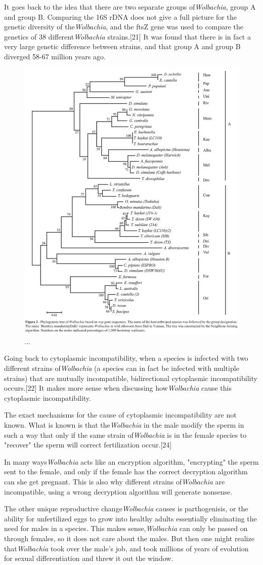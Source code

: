 \documentclass[twocolumn]{article}
\begin{document}
It goes back to the idea that there are two separate groups of\textit{Wolbachia}, group A and group B. Comparing the 16S rDNA does not give a full picture for the genetic diversity of the\textit{Wolbachia}, and the ftsZ gene was used to compare the genetics of 38 different\textit{Wolbachia} strains.[21] It was found that there is in fact a very large genetic difference between strains, and that group A and group B diverged 58-67 million years ago. 

\begin{figure}[!ht]
    \centering
    \includegraphics[width=.4\textwidth]{images/WolbachiaTree.jpg}
    \caption{ ... }
    \label{fig:wolbachiha_tree}
\end{figure}

Going back to cytoplasmic incompatibility, when a species is infected with two different strains of\textit{Wolbachia} (a species can in fact be infected with multiple strains) that are mutually incompatible, bidirectional cytoplasmic incompatibility occurs.[22] It makes more sense when discussing how\textit{Wolbachia} cause this cytoplasmic incompatibility.

The exact mechanisms for the cause of cytoplasmic incompatibility are not known. What is known is that the\textit{Wolbachia} in the male modify the sperm in such a way that only if the same strain of\textit{Wolbachia} is in the female species to "recover" the sperm will correct fertilization occur.[24]

In many ways\textit{Wolbachia} acts like an encryption algorithm, "encrypting" the sperm sent to the female, and only if the female has the correct decryption algorithm can she get pregnant. This is also why different strains of\textit{Wolbachia} are incompatible, using a wrong decryption algorithm will generate nonsense.

The other unique reproductive change\textit{Wolbachia} causes is parthogenisis, or the ability for unfertilized eggs to grow into healthy adults essentially eliminating the need for males in a species. This makes sense,\textit{Wolbachia} can only be passed on through females, so it does not care about the males. But then one might realize that\textit{Wolbachia} took over the male's job, and took millions of years of evolution for sexual differentiation and threw it out the window.
\end{document}
